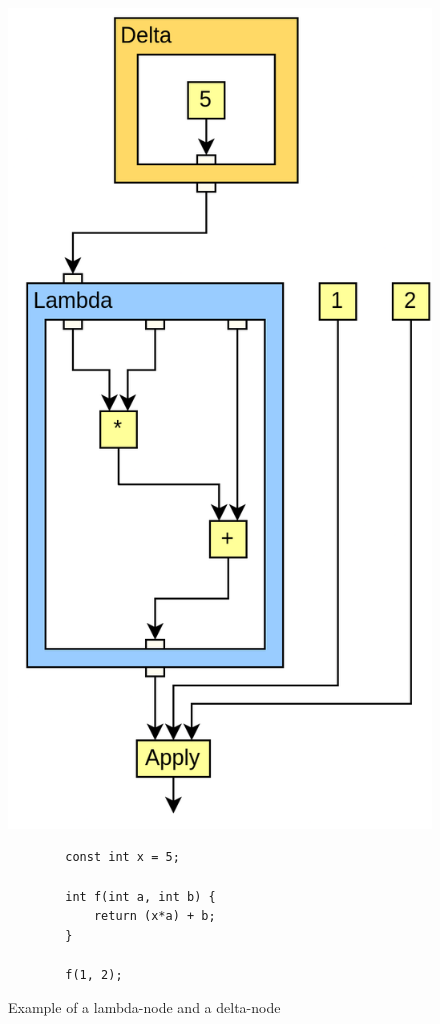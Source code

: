 \begin{figure}[H]
    \centering
    \includegraphics[width=\textwidth/6]{Images/lambda-node-example.png}
    \begin{verbatim}
        const int x = 5;

        int f(int a, int b) {
            return (x*a) + b;
        }

        f(1, 2);
    \end{verbatim}
    \caption{Example of a lambda-node and a delta-node}
    \label{fig:RVSDG_lambda_delta_node}
\end{figure}

